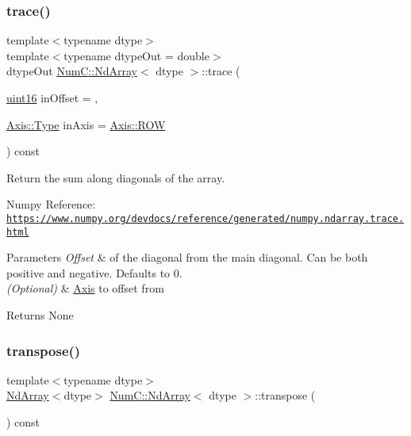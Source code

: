 \subsubsection{\texorpdfstring{trace()}{trace()}}
{\footnotesize\ttfamily template$<$typename dtype$>$ \\
template$<$typename dtype\+Out  = double$>$ \\
dtype\+Out \mbox{\hyperlink{class_num_c_1_1_nd_array}{Num\+C\+::\+Nd\+Array}}$<$ dtype $>$\+::trace (\begin{DoxyParamCaption}\item[{\mbox{\hyperlink{namespace_num_c_a870ab72deafe3efd4eb63e6a2e63a236}{uint16}}}]{in\+Offset = {},  }\item[{\mbox{\hyperlink{struct_num_c_1_1_axis_a8e689044ef1941a03482e730c5e7ebb3}{Axis\+::\+Type}}}]{in\+Axis = {\ttfamily \mbox{\hyperlink{struct_num_c_1_1_axis_a8e689044ef1941a03482e730c5e7ebb3a392f74a34b6718b6d219cb2a08894feb}{Axis\+::\+R\+OW}}} }\end{DoxyParamCaption}) const\hspace{0.3cm}{\ttfamily [inline]}}

Return the sum along diagonals of the array.

Numpy Reference\+: \href{https://www.numpy.org/devdocs/reference/generated/numpy.ndarray.trace.html}{\tt https\+://www.\+numpy.\+org/devdocs/reference/generated/numpy.\+ndarray.\+trace.\+html}


\begin{DoxyParams}{Parameters}
{\em Offset} & of the diagonal from the main diagonal. Can be both positive and negative. Defaults to 0. \\
\hline
{\em (\+Optional)} & \mbox{\hyperlink{struct_num_c_1_1_axis}{Axis}} to offset from\\
\hline
\end{DoxyParams}
\begin{DoxyReturn}{Returns}
None 
\end{DoxyReturn}
\mbox{\label{class_num_c_1_1_nd_array_a3a6a59611e0138b624030d30f362f8ac}} 
\subsubsection{\texorpdfstring{transpose()}{transpose()}}
{\footnotesize\ttfamily template$<$typename dtype$>$ \\
\mbox{\hyperlink{class_num_c_1_1_nd_array}{Nd\+Array}}$<$dtype$>$ \mbox{\hyperlink{class_num_c_1_1_nd_array}{Num\+C\+::\+Nd\+Array}}$<$ dtype $>$\+::transpose (\begin{DoxyParamCaption}{ }\end{DoxyParamCaption}) const\hspace{0.3cm}{\ttfamily [inline]}}

